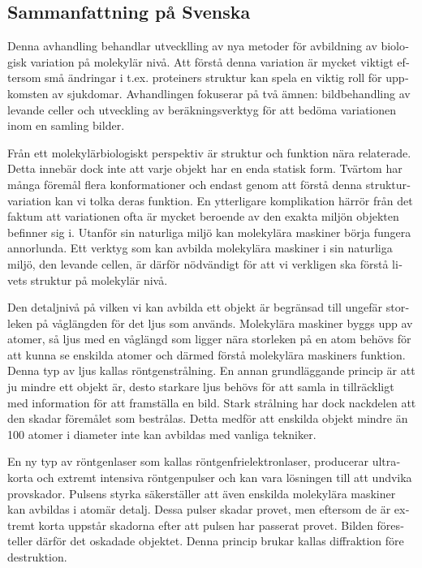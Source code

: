 \begin{otherlanguage}{swedish}

\chapter{Sammanfattning på Svenska}
Denna avhandling behandlar utvecklling av nya metoder för avbildning av biologisk variation på molekylär nivå. Att förstå denna variation är mycket viktigt eftersom små ändringar i t.ex. proteiners struktur kan spela en viktig roll för uppkomsten av sjukdomar. Avhandlingen fokuserar på två ämnen: bildbehandling av levande celler och utveckling av beräkningsverktyg för att bedöma variationen inom en samling bilder.

Från ett molekylärbiologiskt perspektiv är struktur och funktion nära relaterade. Detta innebär dock inte att varje objekt har en enda statisk form. Tvärtom har många föremål flera konformationer och endast genom att förstå denna strukturvariation kan vi tolka deras funktion. En ytterligare komplikation härrör från det faktum att variationen ofta är mycket beroende av den exakta miljön objekten befinner sig i. Utanför sin naturliga miljö kan molekylära maskiner börja fungera annorlunda. Ett verktyg som kan avbilda molekylära maskiner i sin naturliga miljö, den levande cellen, är därför nödvändigt för att vi verkligen ska förstå livets struktur på molekylär nivå.

Den detaljnivå på vilken vi kan avbilda ett objekt är begränsad till ungefär storleken på våglängden för det ljus som används. Molekylära maskiner byggs upp av atomer, så ljus med en våglängd som ligger nära storleken på en atom behövs för att kunna se enskilda atomer och därmed förstå molekylära maskiners funktion. Denna typ av ljus kallas röntgenstrålning. En annan grundläggande princip är att ju mindre ett objekt är, desto starkare ljus behövs för att samla in tillräckligt med information för att framställa en bild. Stark strålning har dock nackdelen att den skadar föremålet som bestrålas. Detta medför att enskilda objekt mindre än 100 atomer i diameter inte kan avbildas med vanliga tekniker.

En ny typ av röntgenlaser som kallas röntgenfrielektronlaser, producerar ultrakorta och extremt intensiva röntgenpulser och kan vara lösningen till att undvika provskador. Pulsens styrka säkerställer att även enskilda molekylära maskiner kan avbildas i atomär detalj. Dessa pulser skadar provet, men eftersom de är extremt korta uppstår skadorna efter att pulsen har passerat provet. Bilden föresteller därför det oskadade objektet. Denna princip brukar kallas diffraktion före destruktion.


\end{otherlanguage}
